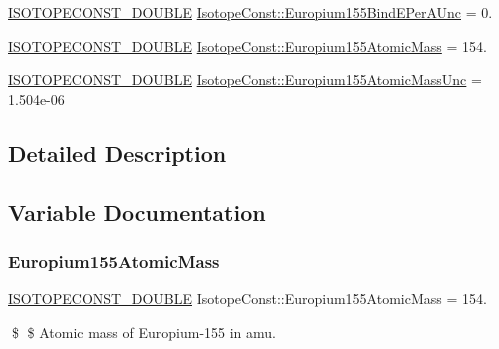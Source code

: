 \begin{DoxyCompactItemize}
\mbox{\hyperlink{group___isotope_const-_macros_ga8f45a7272ce02c0b4c65c44636ed719a}{I\+S\+O\+T\+O\+P\+E\+C\+O\+N\+S\+T\+\_\+\+D\+O\+U\+B\+LE}} \mbox{\hyperlink{group___isotope_const-_europium-_eu155_gaaffadfe39bf4ea35f1c52293a03b700f}{Isotope\+Const\+::\+Europium155\+Bind\+E\+Per\+A\+Unc}} = 0.
\item 
\mbox{\hyperlink{group___isotope_const-_macros_ga8f45a7272ce02c0b4c65c44636ed719a}{I\+S\+O\+T\+O\+P\+E\+C\+O\+N\+S\+T\+\_\+\+D\+O\+U\+B\+LE}} \mbox{\hyperlink{group___isotope_const-_europium-_eu155_ga2804df459496daac3c1e514aecd90d65}{Isotope\+Const\+::\+Europium155\+Atomic\+Mass}} = 154.
\item 
\mbox{\hyperlink{group___isotope_const-_macros_ga8f45a7272ce02c0b4c65c44636ed719a}{I\+S\+O\+T\+O\+P\+E\+C\+O\+N\+S\+T\+\_\+\+D\+O\+U\+B\+LE}} \mbox{\hyperlink{group___isotope_const-_europium-_eu155_gab7ac6b755aee1c5e701b191ba1cd7554}{Isotope\+Const\+::\+Europium155\+Atomic\+Mass\+Unc}} = 1.\+504e-\/06
\end{DoxyCompactItemize}


\subsection{Detailed Description}


\subsection{Variable Documentation}
\mbox{\label{group___isotope_const-_europium-_eu155_ga2804df459496daac3c1e514aecd90d65}} 
\subsubsection{\texorpdfstring{Europium155\+Atomic\+Mass}{Europium155AtomicMass}}
{\footnotesize\ttfamily \mbox{\hyperlink{group___isotope_const-_macros_ga8f45a7272ce02c0b4c65c44636ed719a}{I\+S\+O\+T\+O\+P\+E\+C\+O\+N\+S\+T\+\_\+\+D\+O\+U\+B\+LE}} Isotope\+Const\+::\+Europium155\+Atomic\+Mass = 154.}

\$ \$ Atomic mass of Europium-\/155 in amu. \mbox{\label{group___isotope_const-_europium-_eu155_gab7ac6b755aee1c5e701b191ba1cd7554}} 
